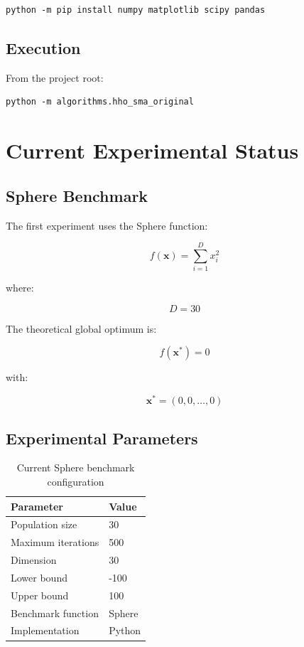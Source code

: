 \documentclass[12pt,a4paper]{report}
\begin{document}
\begin{lstlisting}
python -m pip install numpy matplotlib scipy pandas
\end{lstlisting}

\section{Execution}

From the project root:

\begin{lstlisting}
python -m algorithms.hho_sma_original
\end{lstlisting}

\chapter{Current Experimental Status}

\section{Sphere Benchmark}

The first experiment uses the Sphere function:

\begin{equation}
f(\mathbf{x}) =
\sum_{i=1}^{D}x_i^2
\end{equation}

where:

\begin{equation}
D=30
\end{equation}

The theoretical global optimum is:

\begin{equation}
f(\mathbf{x}^{*})=0
\end{equation}

with:

\begin{equation}
\mathbf{x}^{*}=(0,0,\ldots,0)
\end{equation}

\section{Experimental Parameters}

\begin{table}[H]
\centering
\caption{Current Sphere benchmark configuration}
\begin{tabular}{ll}
\toprule
\textbf{Parameter} & \textbf{Value}\\
\midrule
Population size & 30\\
Maximum iterations & 500\\
Dimension & 30\\
Lower bound & -100\\
Upper bound & 100\\
Benchmark function & Sphere\\
Implementation & Python\\
\bottomrule
\end{tabular}
\end{table}
\end{document}
